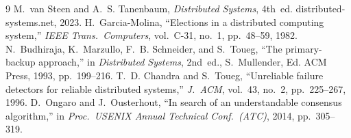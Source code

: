 \documentclass[conference,a4paper]{IEEEtran}
\begin{document}
\begin{thebibliography}{9}
 M.~van Steen and A.~S. Tanenbaum, \emph{Distributed
Systems}, 4th~ed. distributed-systems.net, 2023.
 H.~Garcia-Molina, ``Elections in a distributed
computing system,'' \emph{IEEE Trans.\ Computers}, vol.~C-31, no.~1,
pp.~48--59, 1982.
 N.~Budhiraja, K.~Marzullo, F.~B. Schneider, and
S.~Toueg, ``The primary-backup approach,'' in \emph{Distributed Systems},
2nd~ed., S.~Mullender, Ed. ACM Press, 1993, pp.~199--216.
 T.~D. Chandra and S.~Toueg, ``Unreliable failure
detectors for reliable distributed systems,'' \emph{J.\ ACM}, vol.~43,
no.~2, pp.~225--267, 1996.
 D.~Ongaro and J.~Ousterhout, ``In search of an
understandable consensus algorithm,'' in \emph{Proc.\ USENIX Annual
Technical Conf.\ (ATC)}, 2014, pp.~305--319.
\end{thebibliography}
\end{document}
